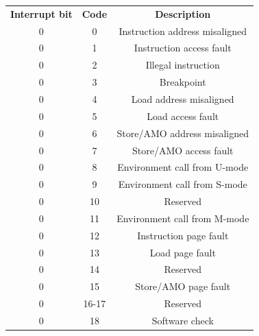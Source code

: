 \begin{table}
  \centering
  \small
  \begin{tabular}{|c|c|c|}
    \hline
    \textbf{Interrupt bit} & \textbf{Code} & \textbf{Description}           \\
    \hhline{===} 0         & 0             & Instruction address misaligned \\
    \hline
    0                      & 1             & Instruction access fault       \\
    \hline
    0                      & 2             & Illegal instruction            \\
    \hline
    0                      & 3             & Breakpoint                     \\
    \hline
    0                      & 4             & Load address misaligned        \\
    \hline
    0                      & 5             & Load access fault              \\
    \hline
    0                      & 6             & Store/AMO address misaligned   \\
    \hline
    0                      & 7             & Store/AMO access fault         \\
    \hline
    0                      & 8             & Environment call from U-mode   \\
    \hline
    0                      & 9             & Environment call from S-mode   \\
    \hline
    0                      & 10            & Reserved                       \\
    \hline
    0                      & 11            & Environment call from M-mode   \\
    \hline
    0                      & 12            & Instruction page fault         \\
    \hline
    0                      & 13            & Load page fault                \\
    \hline
    0                      & 14            & Reserved                       \\
    \hline
    0                      & 15            & Store/AMO page fault           \\
    \hline
    0                      & 16-17         & Reserved                       \\
    \hline
    0                      & 18            & Software check                 \\

\end{tabular}
\end{table}
